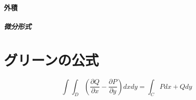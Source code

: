 \documentclass[book]{jlreq}
\begin{document}
\paragraph{外積}
\subparagraph{微分形式}\cite{Yamamoto}
\section{グリーンの公式}
\begin{equation}
    \int\int_D\left(\frac{\partial Q}{\partial x}-\frac{\partial P}{\partial y}\right)dx dy = \int_C P dx + Q dy
\end{equation}
%
%


%
\end{document}
